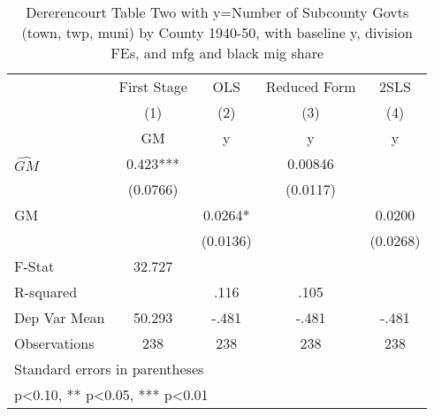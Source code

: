 \begin{table}[htbp]\centering
\def\sym#1{\ifmmode^{#1}\else\(^{#1}\)\fi}
\caption{Dererencourt Table Two with y=Number of Subcounty Govts (town, twp, muni) by County 1940-50, with baseline y, division FEs, and mfg and black mig share}
\begin{tabular}{l*{4}{c}}
\toprule
                    & First Stage   &         OLS   &Reduced Form   &        2SLS   \\
                    &\multicolumn{1}{c}{(1)}&\multicolumn{1}{c}{(2)}&\multicolumn{1}{c}{(3)}&\multicolumn{1}{c}{(4)}\\
                    &\multicolumn{1}{c}{GM}&\multicolumn{1}{c}{y}&\multicolumn{1}{c}{y}&\multicolumn{1}{c}{y}\\
\midrule
$\hat{GM}$          &       0.423***&               &     0.00846   &               \\
                    &    (0.0766)   &               &    (0.0117)   &               \\
\addlinespace
GM                  &               &      0.0264*  &               &      0.0200   \\
                    &               &    (0.0136)   &               &    (0.0268)   \\
\midrule
F-Stat              &      32.727   &               &               &               \\
R-squared           &               &        .116   &        .105   &               \\
Dep Var Mean        &      50.293   &       -.481   &       -.481   &       -.481   \\
Observations        &         238   &         238   &         238   &         238   \\
\bottomrule
\multicolumn{5}{l}{\footnotesize Standard errors in parentheses}\\
\multicolumn{5}{l}{\footnotesize * p<0.10, ** p<0.05, *** p<0.01}\\
\end{tabular}
\end{table}
